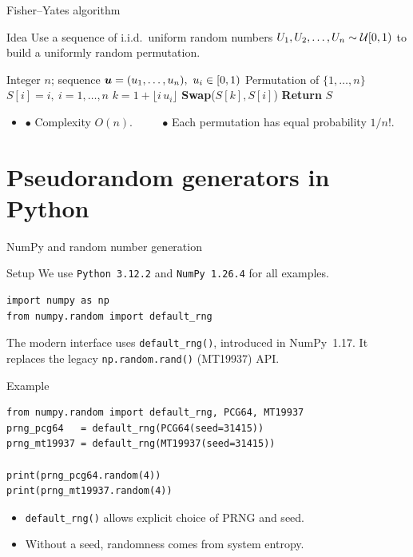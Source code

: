 \documentclass[aspectratio=169]{beamer}
\begin{document}
\begin{frame}{Fisher–Yates algorithm}
\begin{block}{Idea}
Use a sequence of i.i.d.\ uniform random numbers $U_1,U_2,\ldots,U_n \sim {\cal U}[0,1)$
to build a uniformly random permutation.
\end{block}

\begin{algorithm}[H]
\caption{\textsf{Fisher–Yates} (Random permutation)}\label{alg:fisher-yates}
\begin{algorithmic}[1]
\Require Integer \( n \); sequence \( \bfu=(u_1,\ldots,u_n),\ u_i\in[0,1) \)
\Ensure Permutation of \( \{1,\ldots,n\} \)
\State $S[i]=i,\ i=1,\ldots,n$
  \State $k=1+\lfloor i\,u_i\rfloor$ 
  \State \textbf{Swap}($S[k],S[i]$)
\EndFor
\State \textbf{Return} $S$
\end{algorithmic}
\end{algorithm}

\begin{itemize}
  \item[] $\bullet$ Complexity $O(n)$. $\qquad$ $\bullet$ Each permutation has equal probability $1/n!$.
\end{itemize}
\end{frame}


\section{Pseudorandom generators in Python}

\begin{frame}[fragile]{NumPy and random number generation}
\begin{block}{Setup}
We use \texttt{Python 3.12.2} and \texttt{NumPy 1.26.4} for all examples.
\begin{lstlisting}[frame=none,numbers=none]
import numpy as np
from numpy.random import default_rng
\end{lstlisting}
The modern interface uses \texttt{default\_rng()}, introduced in NumPy~1.17.
It replaces the legacy \texttt{np.random.rand()} (MT19937) API.
\end{block}

\begin{block}{Example}
\begin{lstlisting}[frame=none,numbers=none]
from numpy.random import default_rng, PCG64, MT19937
prng_pcg64   = default_rng(PCG64(seed=31415))
prng_mt19937 = default_rng(MT19937(seed=31415))

print(prng_pcg64.random(4))
print(prng_mt19937.random(4))
\end{lstlisting}
\end{block}

\begin{itemize}
  \item \texttt{default\_rng()} allows explicit choice of PRNG and seed.
  \item Without a seed, randomness comes from system entropy.
\end{itemize}
\end{frame}
\end{document}
